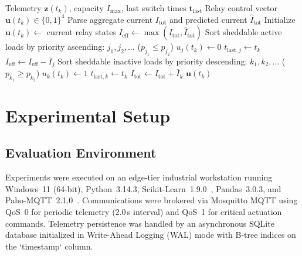 \documentclass[journal,10pt,twocolumn]{IEEEtran}
\begin{document}
\begin{algorithm}[h]
\caption{Autonomous Priority Knapsack Governor}
\label{alg:governor}
\begin{algorithmic}[1]
\REQUIRE Telemetry $\mathbf{z}(t_k)$, capacity $I_{\max}$, last switch times $\mathbf{t}_{\text{last}}$
\ENSURE Relay control vector $\mathbf{u}(t_k) \in \{0, 1\}^4$
\STATE Parse aggregate current $I_{\text{tot}}$ and predicted current $\hat{I}_{\text{tot}}$
\STATE Initialize $\mathbf{u}(t_k) \leftarrow$ current relay states
\STATE $I_{\text{eff}} \leftarrow \max(I_{\text{tot}}, \hat{I}_{\text{tot}})$
 
    \STATE Sort sheddable active loads by priority ascending: $j_1, j_2, \dots$ ($p_{j_1} \le p_{j_2}$)
            \STATE $u_j(t_k) \leftarrow 0$ 
            \STATE $t_{\text{last}, j} \leftarrow t_k$
            \STATE $I_{\text{eff}} \leftarrow I_{\text{eff}} - \bar{I}_j$
                \BREAK
            \ENDIF
        \ENDIF
    \ENDFOR
{} 
    \STATE Sort sheddable inactive loads by priority descending: $k_1, k_2, \dots$ ($p_{k_1} \ge p_{k_2}$)
            \STATE $u_k(t_k) \leftarrow 1$ 
            \STATE $t_{\text{last}, k} \leftarrow t_k$
            \STATE $I_{\text{tot}} \leftarrow I_{\text{tot}} + \bar{I}_k$
        \ENDIF
    \ENDFOR
\ENDIF
\RETURN $\mathbf{u}(t_k)$
\end{algorithmic}
\end{algorithm}

\section{Experimental Setup}

\subsection{Evaluation Environment}
Experiments were executed on an edge-tier industrial workstation running Windows~11 (64-bit), Python~3.14.3, Scikit-Learn~1.9.0~\cite{pedregosa2011scikit}, Pandas~3.0.3, and Paho-MQTT~2.1.0~\cite{light2017mosquitto}. Communications were brokered via Mosquitto MQTT using QoS~0 for periodic telemetry ($2.0$\,s interval) and QoS~1 for critical actuation commands. Telemetry persistence was handled by an asynchronous SQLite database initialized in Write-Ahead Logging (WAL) mode with B-tree indices on the `timestamp` column.
\end{document}
